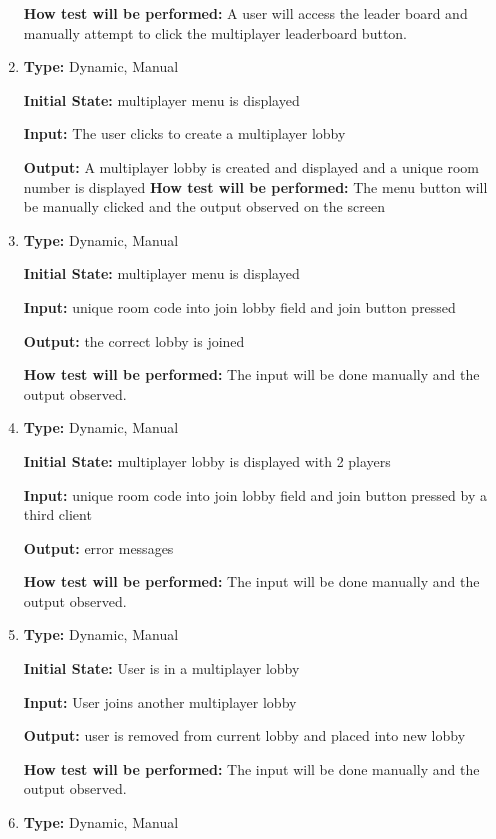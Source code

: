 \documentclass[12pt, titlepage]{article}
\begin{document}
\begin{enumerate}[{FR-UI-}1. ]
		\textbf{How test will be performed:} A user will access the leader board and manually attempt to click the multiplayer leaderboard button.
		
		\item
		\textbf{Type:} Dynamic, Manual
		
		\textbf{Initial State:} multiplayer menu is displayed
		
		\textbf{Input:} The user clicks to create a multiplayer lobby
		
		\textbf{Output:} A multiplayer lobby is created and displayed and a unique room number is displayed		
		\textbf{How test will be performed:} The menu button will be manually clicked and the output observed on the screen
		
		\item
		\textbf{Type:} Dynamic, Manual
		
		\textbf{Initial State:} multiplayer menu is displayed
		
		\textbf{Input:} unique room code into join lobby field and join button pressed
		
		\textbf{Output:} the correct lobby is joined
		
		\textbf{How test will be performed:} The input will be done manually and the output observed.
		
		\item
		\textbf{Type:} Dynamic, Manual
		
		\textbf{Initial State:} multiplayer lobby is displayed with 2 players
		
		\textbf{Input:} unique room code into join lobby field and join button pressed by a third client
		
		\textbf{Output:} error messages
		
		\textbf{How test will be performed:} The input will be done manually and the output observed.
		
		\item
		\textbf{Type:} Dynamic, Manual
		
		\textbf{Initial State:} User is in a multiplayer lobby
		
		\textbf{Input:} User joins another multiplayer lobby
		
		\textbf{Output:} user is removed from current lobby and placed into new lobby
		
		\textbf{How test will be performed:} The input will be done manually and the output observed.
		
		\item
		\textbf{Type:} Dynamic, Manual
		

\end{enumerate}
\end{document}
